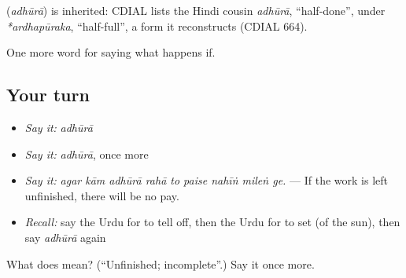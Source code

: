 \begin{cousinweb}
\textbf{} (\emph{adhūrā}) is inherited: CDIAL lists the Hindi cousin \emph{adhūrā}, \textquotedblleft{}half-done\textquotedblright{}, under \emph{*ardhapūraka}, \textquotedblleft{}half-full\textquotedblright{}, a form it reconstructs (CDIAL 664).
\end{cousinweb}

\begin{grammarlens}[title={What you've built}]
One more word for saying what happens if.
\end{grammarlens}

\subsection*{Your turn}
\begin{itemize}
\raggedright
  \item \emph{Say it:} \emph{adhūrā}
  \item \emph{Say it:} \emph{adhūrā}, once more
  \item \emph{Say it:} \emph{agar kām adhūrā rahā to paise nahīṅ mileṅ ge.} — If the work is left unfinished, there will be no pay.
  \item \emph{Recall:} say the Urdu for to tell off, then the Urdu for to set (of the sun), then say \emph{adhūrā} again
\end{itemize}

\begin{tcolorbox}[breakable,colback=teal!4,colframe=teal!35!black,title={Before you move on}]
What does  mean? (\textquotedblleft{}Unfinished; incomplete\textquotedblright{}.) Say it once more.
\end{tcolorbox}
